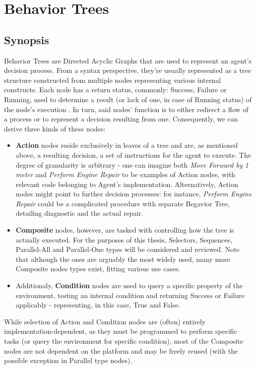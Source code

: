 \section{Behavior Trees}
\subsection{Synopsis}
Behavior Trees are Directed Acyclic Graphs that are used to represent an agent's decision process. From a syntax perspective, they're usually represented as a tree structure constructed from multiple nodes representing various internal constructs. Each node has a return status, commonly: Success, Failure or Running, used to determine a result (or lack of one, in case of Running status) of the node’s execution \cite{ksheperthesis}.  In turn, said nodes' function is to either redirect a flow of a process or to represent a decision resulting from one.
Consequently, we can derive three kinds of these nodes:
\begin{itemize}
    \item \textbf{Action} nodes reside exclusively in leaves of a tree and are, as mentioned above, a resulting decision, a set of instructions for the agent to execute. The degree of granularity is arbitrary - one can imagine both \textit{Move Forward by 1 meter} and \textit{Perform Engine Repair} to be examples of Action nodes, with relevant code belonging to Agent's implementation. Alternatively, Action nodes might point to further decision processes: for instance, \textit{Perform Engine Repair} could be a complicated procedure with separate Begavior Tree, detailing diagnostic and the actual repair.
    \item \textbf{Composite} nodes, however, are tasked with controlling how the tree is actually executed. For the purposes of this thesis, Selectors, Sequences, Parallel-All and Parallel-One types will be considered and reviewed. Note that although the ones are arguably the most widely used, many more Composite nodes types exist, fitting various use cases.
    \item Additionaly, \textbf{Condition} nodes are used to query a specific property of the environment, testing an internal condition and returning Success or Failure applicably - representing, in this case, True and False.
\end{itemize}
While selection of  Action and Condition nodes are (often) entirely implementation-dependent, as they must be programmed to perform specific tasks (or query the environment for specific condition), most of the Composite nodes are not dependent on the platform and may be freely reused (with the possible exception in Parallel type nodes).

